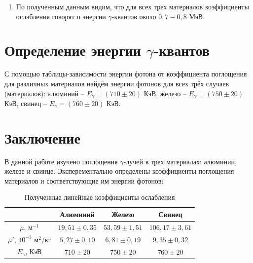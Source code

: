 \begin{enumerate}
    \item По полученным данным видим, что для всех трех материалов коэффициенты ослабления говорят о энергии $\gamma$-квантов около $0,7-0,8$ МэВ.
\end{enumerate}

\section{Определение энергии $\gamma$-квантов}

    С помощью таблицы-зависимости энергии фотона от коэффициента поглощения для различных материалов найдём энергии фотонов для всех трёх случаев (материалов): алюминий -- $E_{\gamma} = (710 \pm 20)$ КэВ, железо -- $E_{\gamma} = (750 \pm 20)$ КэВ, свинец -- $E_{\gamma} = (760 \pm 20)$ КэВ.

\section{Заключение}

    В данной работе изучено поглощения $\gamma$-лучей в трех материалах: алюминии, железе и свинце. Эксперементально определены коэффициенты поглощения материалов и соответствующие им энергии фотонов:
    \begin{table}[h!]
        \centering
        \begin{tabular}{|c|c|c|c|}
            \hline & Алюминий        & Железо        & Свинец                                \\ \hline
            $\mu$, м$^{-1}$ & $19,51 \pm 0,35$ & $53,59 \pm 1,51$ & $106,17 \pm 3,61$        \\ \hline
            $\mu'$, $10^{-3}$ м$^2$/кг & $5,27 \pm 0,10$ & $6,81 \pm 0,19$ & $9,35 \pm 0,32$ \\ \hline
            $E_{\gamma}$, КэВ & $710 \pm 20$ & $750 \pm 20$ & $760 \pm 20$ \\ \hline
        \end{tabular}
    \caption{Полученные линейные коэффициенты ослабления}
    \end{table}